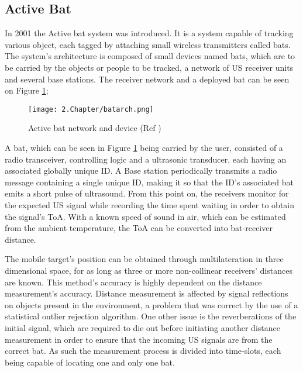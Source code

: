   
\subsection{Active Bat}  
\label{subsec:bat}  
  
  
In 2001 the Active bat system \cite{bat}was introduced. It is a system capable of tracking various object, each tagged by attaching small wireless transmitters called bats. The system's architecture is composed of small devices named bats, which are to be carried by the objects or people to be tracked, a network of \acf{US} receiver units and several base stations\cite{bat1}. The receiver network and a deployed bat can be seen on Figure \ref{fig:bat};  
  
  
\begin{figure}[H]  
\centering  
\texttt{[image: 2.Chapter/batarch.png]}  
\caption[Active bat network and device(Ref \cite{batfig}) ]{Active bat network and device (Ref \cite{batfig}) }  
\label{fig:bat}  
\end{figure}  
  
  
A bat, which can be seen in Figure \ref{fig:bat} being carried by the user, consisted of a radio transceiver, controlling logic and a ultrasonic transducer, each having an associated globally unique ID. A Base station periodically transmits a radio message containing a single unique ID, making it so that the ID's associated bat emits a short pulse of ultrasound. From this point on, the receivers monitor for the expected \ac{US} signal while recording the time spent waiting in order to obtain the signal's \ac{ToA}. With a known speed of sound in air, which can be estimated from the ambient temperature, the \ac{ToA} can be converted into bat-receiver distance.  
  
  
The mobile target's position can be obtained through multilateration in three dimensional space, for as long as three or more non-collinear receivers' distances are known. This method's accuracy is highly dependent on the distance measurement's accuracy. Distance measurement is affected by signal reflections on objects present in the environment, a problem that was correct by the use of a statistical outlier rejection algorithm. One other issue is the reverberations of the initial signal, which are required to die out before initiating another distance measurement in order to ensure that the incoming \ac{US} signals are from the correct bat. As such the measurement process is divided into time-slots, each being capable of locating one and only one bat.  
  
